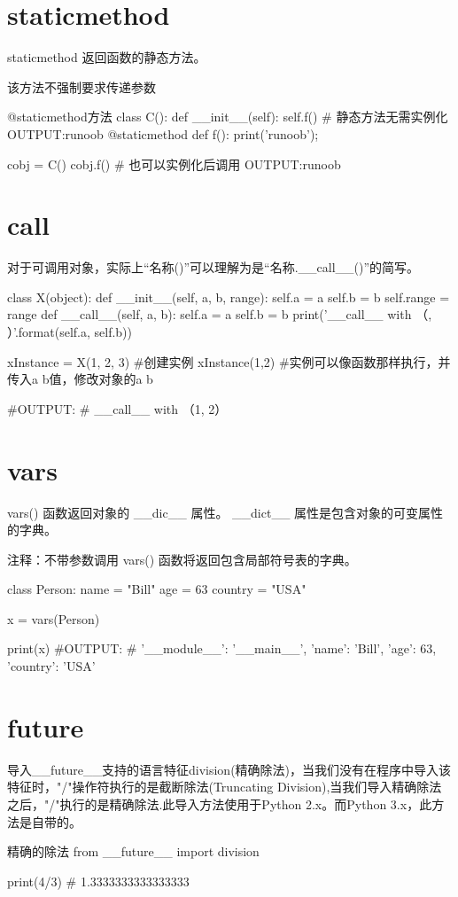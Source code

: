 \documentclass[11pt]{article}
\begin{document}
\section{staticmethod}
staticmethod 返回函数的静态方法。

该方法不强制要求传递参数

\begin{Python}{@staticmethod方法}
class C():
def __init__(self):
self.f()  # 静态方法无需实例化   OUTPUT:runoob
@staticmethod
def f():
print('runoob');

cobj = C()
cobj.f()  # 也可以实例化后调用       OUTPUT:runoob
\end{Python}
\section{call}
对于可调用对象，实际上“名称()”可以理解为是“名称.\_\_call\_\_()”的简写。
\begin{Python}{}
class X(object):
	def __init__(self, a, b, range):
		self.a = a
		self.b = b
		self.range = range
	def __call__(self, a, b):
		self.a = a
		self.b = b
		print('__call__ with （{}, {}）'.format(self.a, self.b))

xInstance = X(1, 2, 3)  #创建实例
xInstance(1,2)          #实例可以像函数那样执行，并传入a b值，修改对象的a b

#OUTPUT:
#		__call__ with （1, 2）
\end{Python}
\section{vars}
vars() 函数返回对象的 \_\_dic\_\_ 属性。
\_\_dict\_\_ 属性是包含对象的可变属性的字典。

注释：不带参数调用 vars() 函数将返回包含局部符号表的字典。
\begin{Python}
class Person:
name = "Bill"
age = 63
country = "USA"

x = vars(Person)

print(x)
#OUTPUT:
#       {'__module__': '__main__', 'name': 'Bill', 'age': 63, 'country': 'USA'}
\end{Python}
\section{future}
导入\_\_future\_\_支持的语言特征division(精确除法)，当我们没有在程序中导入该特征时，"/"操作符执行的是截断除法(Truncating Division),当我们导入精确除法之后，"/"执行的是精确除法.此导入方法使用于Python 2.x。而Python 3.x，此方法是自带的。
\begin{Python}{精确的除法}
from __future__ import division

print(4/3)
#   1.3333333333333333
\end{Python}
\end{document}
